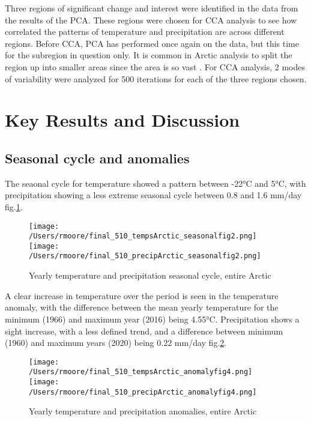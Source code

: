 \documentclass[11pt, oneside]{article}
\begin{document}
Three regions of significant change and interest were identified in the data from the results of the PCA. These regions were chosen for CCA analysis to see how correlated the patterns of temperature and precipitation are across different regions. Before CCA, PCA has performed once again on the data, but this time for the subregion in question only. It is common in Arctic analysis to split the region up into smaller areas since the area is so vast \cite{zhang2018variability}.  For CCA analysis, 2 modes of variability were analyzed for 500 iterations for each of the three regions chosen.
 
 

\section{Key Results and Discussion}
\subsection{Seasonal cycle and anomalies}
The seaonal cycle for temperature showed a pattern between -22°C and 5°C, with precipitation showing a less extreme seasonal cycle between 0.8 and 1.6 mm/day fig.\ref{seasonal}. 
\begin{figure}[!htb]
    \centering
      \texttt{[image: /Users/rmoore/final\_510\_tempsArctic\_seasonalfig2.png]}
    \endminipage
      \texttt{[image: /Users/rmoore/final\_510\_precipArctic\_seasonalfig2.png]}
    \endminipage
    \caption{Yearly temperature and precipitation seasonal cycle, entire Arctic}\label{seasonal}
    \end{figure}
A clear increase in temperature over the period is seen in the temperature anomaly, with the difference between the mean yearly temperature for the minimum (1966) and maximum year (2016) being 4.55°C. Precipitation shows a sight increase, with a less defined trend, and a difference between minimum (1960) and maximum years (2020) being 0.22 mm/day fig.\ref{anomaly}.
\begin{figure}[!htb]
\centering
{}
  \texttt{[image: /Users/rmoore/final\_510\_tempsArctic\_anomalyfig4.png]}
\endminipage
{}
  \texttt{[image: /Users/rmoore/final\_510\_precipArctic\_anomalyfig4.png]}
\endminipage
\caption{Yearly temperature and precipitation anomalies, entire Arctic}\label{anomaly}
\end{figure}
\end{document}
